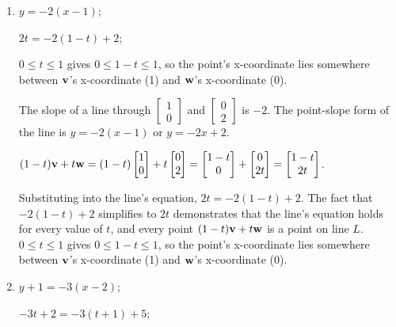 \begin{solution}
\begin{enumerate}
  \item 
  	\begin{answer}
	$y = -2(x - 1)$;
	
	$2t = -2(1 - t) + 2$;
	
	$0 \le t \le 1$ gives $0 \le 1 - t \le 1$, so the point's x-coordinate lies somewhere between $\mathbf{v}$'s x-coordinate (1) and $\mathbf{w}$'s x-coordinate (0).
	\end{answer}
	The slope of a line through $\begin{bmatrix} 1 \\ 0 \end{bmatrix}$ and $\begin{bmatrix} 0 \\ 2 \end{bmatrix}$ is $-2$. The point-slope form of the line is $y = -2(x - 1)$ or $y = -2x + 2$. 
	
	$(1 - t)\mathbf{v} + t\mathbf{w} = (1-t)\begin{bmatrix} 1 \\ 0 \end{bmatrix} + t\begin{bmatrix} 0 \\ 2 \end{bmatrix} = \begin{bmatrix} 1 - t \\ 0 \end{bmatrix} + \begin{bmatrix} 0 \\ 2t \end{bmatrix} = \begin{bmatrix} 1 - t \\ 2t \end{bmatrix}$.
	
	Substituting into the line's equation, $2t = -2(1 - t) + 2$. The fact that $-2(1 - t) + 2$ simplifies to $2t$ demonstrates that the line's equation holds for every value of $t$, and every point $(1 - t)\mathbf{v} + t\mathbf{w}$ is a point on line $L$. $0 \le t \le 1$ gives $0 \le 1 - t \le 1$, so the point's x-coordinate lies somewhere between $\mathbf{v}$'s x-coordinate (1) and $\mathbf{w}$'s x-coordinate (0).
	
  \item \begin{answer}
	$y + 1 = -3(x - 2)$;
	
	$-3t + 2 = -3(t + 1) + 5$;
	

\end{answer}
\end{enumerate}
\end{solution}
